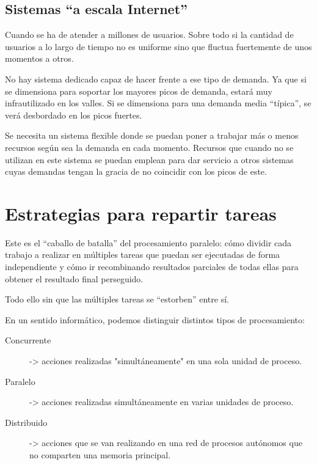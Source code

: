 \documentclass[spanish,12pt,a4paper,final,oneside]{book}
\begin{document}
\subsection{Sistemas ``a escala Internet''}

Cuando se ha de atender a millones de usuarios. Sobre todo si la cantidad de usuarios a lo largo de tiempo no es uniforme sino que fluctua fuertemente de unos momentos a otros. 

No hay sistema dedicado capaz de hacer frente a ese tipo de demanda. Ya que si se dimensiona para soportar los mayores picos de demanda, estará muy infrautilizado en los valles. Si se dimensiona para una demanda media ``típica'', se verá desbordado en los picos fuertes.

Se necesita un sistema flexible donde se puedan poner a trabajar más o menos recursos según sea la demanda en cada momento. Recursos que cuando no se utilizan en este sistema se puedan emplean para dar servicio a otros sistemas cuyas demandas tengan la gracia de no coincidir con los picos de este.


\section{Estrategias para repartir tareas}

Este es el ``caballo de batalla'' del procesamiento paralelo: cómo dividir cada trabajo a realizar en múltiples tareas que puedan ser ejecutadas de forma independiente y cómo ir recombinando resultados parciales de todas ellas para obtener el resultado final perseguido.

Todo ello sin que las múltiples tareas se ``estorben'' entre sí.


En un sentido informático, podemos distinguir distintos tipos de procesamiento:

\begin{description}

\item[Concurrente] -> acciones realizadas "simultáneamente" en una sola unidad de proceso.

\item[Paralelo] -> acciones realizadas simultáneamente en varias unidades de proceso.

\item[Distribuido] -> acciones que se van realizando en una red de procesos autónomos que no comparten una memoria principal.

\end{description}
\end{document}
